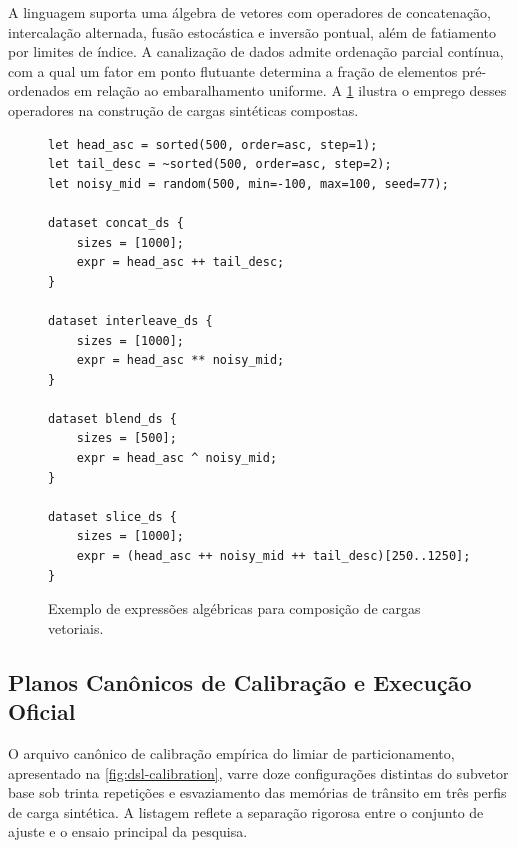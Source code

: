 \documentclass[12pt]{article}
\begin{document}
A linguagem suporta uma álgebra de vetores com operadores de concatenação, intercalação alternada, fusão estocástica e inversão pontual, além de fatiamento por limites de índice. A canalização de dados admite ordenação parcial contínua, com a qual um fator em ponto flutuante determina a fração de elementos pré-ordenados em relação ao embaralhamento uniforme. A \cref{fig:dsl-algebra} ilustra o emprego desses operadores na construção de cargas sintéticas compostas.

\begin{figure}[htbp]
\centering
\begin{verbatim}
let head_asc = sorted(500, order=asc, step=1);
let tail_desc = ~sorted(500, order=asc, step=2);
let noisy_mid = random(500, min=-100, max=100, seed=77);

dataset concat_ds {
	sizes = [1000];
	expr = head_asc ++ tail_desc;
}

dataset interleave_ds {
	sizes = [1000];
	expr = head_asc ** noisy_mid;
}

dataset blend_ds {
	sizes = [500];
	expr = head_asc ^ noisy_mid;
}

dataset slice_ds {
	sizes = [1000];
	expr = (head_asc ++ noisy_mid ++ tail_desc)[250..1250];
}
\end{verbatim}
\caption{Exemplo de expressões algébricas para composição de cargas vetoriais.}
\label{fig:dsl-algebra}
\end{figure}

\clearpage
\subsection{Planos Canônicos de Calibração e Execução Oficial}\label{sec:apendice-dsl-planos}

O arquivo canônico de calibração empírica do limiar de particionamento, apresentado na \cref{fig:dsl-calibration}, varre doze configurações distintas do subvetor base sob trinta repetições e esvaziamento das memórias de trânsito em três perfis de carga sintética. A listagem reflete a separação rigorosa entre o conjunto de ajuste e o ensaio principal da pesquisa.
\end{document}
